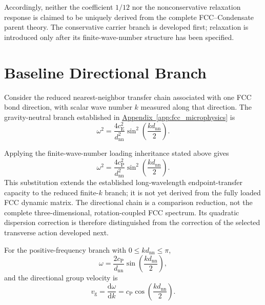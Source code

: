 Accordingly, neither the coefficient \(1/12\) nor the nonconservative
relaxation response is claimed to be uniquely derived from the complete
FCC--Condensate parent theory. The conservative carrier branch is developed
first; relaxation is introduced only after its finite-wave-number structure
has been specified.


\section{Baseline Directional Branch}
\label{sec:photon_relaxation_baseline_branch}

Consider the reduced nearest-neighbor transfer chain associated with one FCC
bond direction, with scalar wave number \(k\) measured along that direction.
The gravity-neutral branch established in
\hyperref[app:fcc_microphysics]{Appendix~\ref*{app:fcc_microphysics}} is
\begin{equation}
    \omega^2
    =
    \frac{4c_{\mathrm E}^2}{d_{\mathrm{nn}}^2}
    \sin^2
    \left(
        \frac{kd_{\mathrm{nn}}}{2}
    \right).
    \label{eq:photon_relaxation_baseline_neutral_branch}
\end{equation}

Applying the finite-wave-number loading inheritance stated above gives
\begin{equation}
    \omega^2
    =
    \frac{4c_{\mathrm P}^2}{d_{\mathrm{nn}}^2}
    \sin^2
    \left(
        \frac{kd_{\mathrm{nn}}}{2}
    \right).
    \label{eq:photon_relaxation_baseline_dispersion}
\end{equation}
This substitution extends the established long-wavelength endpoint-transfer
capacity to the reduced finite-\(k\) branch; it is not yet derived from the
fully loaded FCC dynamic matrix. The directional chain is a comparison
reduction, not the complete three-dimensional, rotation-coupled FCC
spectrum. Its quadratic dispersion correction is therefore distinguished
from the correction of the selected transverse action developed next.

For the positive-frequency branch with
\(0\leq kd_{\mathrm{nn}}\leq\pi\),
\begin{equation}
    \omega
    =
    \frac{2c_{\mathrm P}}{d_{\mathrm{nn}}}
    \sin
    \left(
        \frac{kd_{\mathrm{nn}}}{2}
    \right),
    \label{eq:photon_relaxation_baseline_positive_branch}
\end{equation}
and the directional group velocity is
\begin{equation}
    v_{\mathrm g}
    =
    \frac{\mathrm d\omega}{\mathrm dk}
    =
    c_{\mathrm P}
    \cos
    \left(
        \frac{kd_{\mathrm{nn}}}{2}
    \right).
    \label{eq:photon_relaxation_baseline_group_velocity}
\end{equation}

